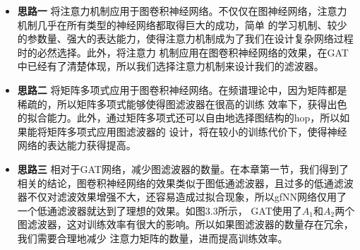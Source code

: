 \begin{itemize}
    \item \textbf{思路一} \quad
    将注意力机制应用于图卷积神经网络。不仅仅在图神经网络，注意力机制几乎在所有类型的神经网络都取得巨大的成功，简单
    的学习机制、较少的参数量、强大的表达能力，使得注意力机制成为了我们在设计复杂网络过程时的必然选择。此外，将注意力
    机制应用在图卷积神经网络的效果，在GAT中已经有了清楚体现，所以我们选择注意力机制来设计我们的滤波器。
    
    \item \textbf{思路二} \quad
    将矩阵多项式应用于图卷积神经网络。在频谱理论中，因为矩阵都是稀疏的，所以矩阵多项式能够使得图滤波器在很高的训练
    效率下，获得出色的拟合能力。此外，通过矩阵多项式还可以自由地选择图结构的hop，所以如果能将矩阵多项式应用图滤波器的
    设计，将在较小的训练代价下，使得神经网络的表达能力获得提高。

    \item \textbf{思路三} \quad
    相对于GAT网络，减少图滤波器的数量。在本章第一节，我们得到了相关的结论，图卷积神经网络的效果类似于图低通滤波器，且过多的低通滤波
    器不仅对滤波效果增强不大，还容易造成过拟合现象，所以gfNN网络仅用了一个低通滤波器就达到了理想的效果。如图3.3所示，
    GAT使用了$A_{1}$和$A_{2}$两个图滤波器，这对训练效率有很大的影响。所以如果图滤波器的数量存在冗余，我们需要合理地减少
    注意力矩阵的数量，进而提高训练效率。

\end{itemize}


